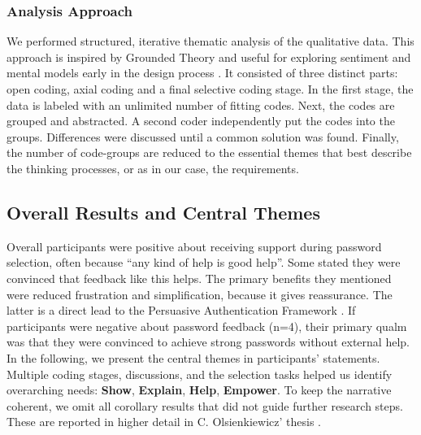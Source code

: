 \subsubsection{Analysis Approach}
We performed structured, iterative thematic analysis of the qualitative data. This approach is inspired by Grounded  Theory and useful for exploring sentiment and mental models early in the design process \cite{Strauss1990}. It consisted of three distinct parts: open coding, axial coding and a final selective coding stage. In the first stage, the data is labeled with an unlimited number of fitting codes. Next, the codes are grouped and abstracted. A second coder independently put the codes into the groups. Differences were discussed until a common solution was found. Finally, the number of code-groups are reduced to the essential themes that best describe the thinking processes, or as in our case, the requirements. 


\subsection{Overall Results and Central Themes}

Overall participants were positive about receiving support during password selection, often because ``any kind of help is good help''. Some stated they were convinced that feedback like this helps. The primary benefits they mentioned were reduced frustration and simplification, because it gives reassurance. The latter is a direct lead to the Persuasive Authentication Framework \cite{Forget2007PersuasionEducationSecurity}. If participants were negative about password feedback (n=4), their primary qualm was that they were convinced to achieve strong passwords without external help. In the following, we present the central themes in participants' statements. Multiple coding stages, discussions, and the selection tasks helped us identify overarching needs: \textbf{Show}, \textbf{Explain}, \textbf{Help}, \textbf{Empower}. To keep the narrative coherent, we omit all corollary results that did not guide further research steps. These are reported in higher detail in C. Olsienkiewicz' thesis \cite{Olsienkiewicz2016BAThesis}. 

